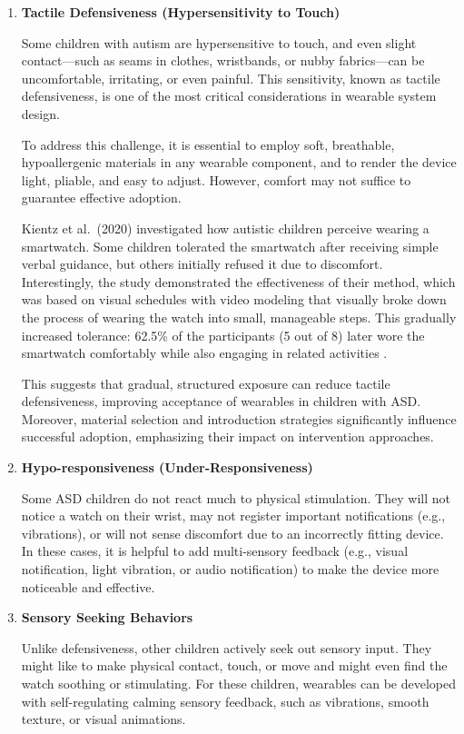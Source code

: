 \documentclass[a4paper,12pt]{report}
\begin{document}
\begin{enumerate}[label=\arabic*.]

\item \textbf{Tactile Defensiveness (Hypersensitivity to Touch)} 

Some children with autism are hypersensitive to touch, and even slight contact---such as seams in clothes, wristbands, or nubby fabrics---can be uncomfortable, irritating, or even painful. This sensitivity, known as tactile defensiveness, is one of the most critical considerations in wearable system design.

To address this challenge, it is essential to employ soft, breathable, hypoallergenic materials in any wearable component, and to render the device light, pliable, and easy to adjust. However, comfort may not suffice to guarantee effective adoption.

Kientz et al.\ (2020) investigated how autistic children perceive wearing a smartwatch. Some children tolerated the smartwatch after receiving simple verbal guidance, but others initially refused it due to discomfort. Interestingly, the study demonstrated the effectiveness of their method, which was based on visual schedules with video modeling that visually broke down the process of wearing the watch into small, manageable steps. This gradually increased tolerance: 62.5\% of the participants (5 out of 8) later wore the smartwatch comfortably while also engaging in related activities \cite{obrien2020_smartwatch_ASD}.

This suggests that gradual, structured exposure can reduce tactile defensiveness, improving acceptance of wearables in children with ASD. Moreover, material selection and introduction strategies significantly influence successful adoption, emphasizing their impact on intervention approaches.

\item \textbf{Hypo-responsiveness (Under-Responsiveness)}

Some ASD children do not react much to physical stimulation. They will not notice a watch on their wrist, may not register important notifications (e.g., vibrations), or will not sense discomfort due to an incorrectly fitting device. In these cases, it is helpful to add multi-sensory feedback (e.g., visual notification, light vibration, or audio notification) to make the device more noticeable and effective.

\item \textbf{Sensory Seeking Behaviors}

Unlike defensiveness, other children actively seek out sensory input. They might like to make physical contact, touch, or move and might even find the watch soothing or stimulating. For these children, wearables can be developed with self-regulating calming sensory feedback, such as vibrations, smooth texture, or visual animations.

\end{enumerate}
\end{document}
